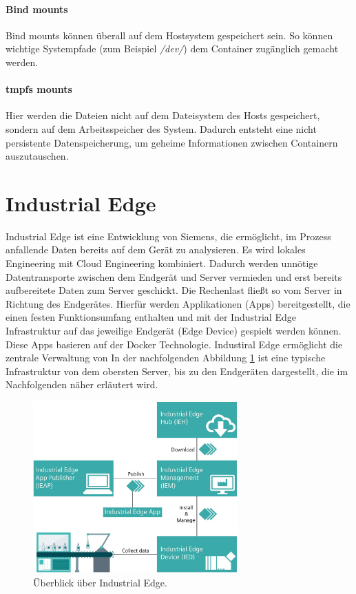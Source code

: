 				\paragraph{Bind mounts}
					Bind mounts können überall auf dem Hostsystem gespeichert sein.
					So können wichtige Systempfade (zum Beispiel \textit{/dev/}) dem Container zugänglich gemacht werden. \cite{dockerStorage}
				
				\paragraph{tmpfs mounts}
					Hier werden die Dateien nicht auf dem Dateisystem des Hosts gespeichert, sondern auf dem Arbeitsspeicher des System.
					Dadurch entsteht eine nicht persistente Datenspeicherung, um geheime Informationen zwischen Containern auszutauschen. \cite{dockerStorage}
					
				
	\section{Industrial Edge}
	\label{Grundlagen:IndustrialEdge}
		Industrial Edge ist eine Entwicklung von Siemens, die ermöglicht, im Prozess anfallende Daten bereits auf dem Gerät zu analysieren.
		Es wird lokales Engineering mit Cloud Engineering kombiniert. \cite{siemensIEM_gettingStarted}
		Dadurch werden unnötige Datentransporte zwischen dem Endgerät und Server vermieden und erst bereits aufbereitete Daten zum Server geschickt.
		Die Rechenlast fließt so vom Server in Richtung des Endgerätes.
		Hierfür werden Applikationen (Apps) bereitgestellt, die einen festen Funktionsumfang enthalten und mit der Industrial Edge Infrastruktur auf das jeweilige Endgerät (Edge Device) gespielt werden können.
		Diese Apps basieren auf der Docker Technologie.
		Industiral Edge ermöglicht die zentrale Verwaltung von
		In der nachfolgenden Abbildung \ref{fig:Grundlagen:IndustrialEdge:Ueberblick} ist eine typische Infrastruktur von dem obersten Server, bis zu den Endgeräten dargestellt, die im Nachfolgenden näher erläutert wird.
		\begin{figure}[h]
			\centering
			\includegraphics[width=0.70\textwidth]{"Bilder/Edge_uebersicht.jpg"}
			\caption{Überblick über Industrial Edge. \cite{siemensIEM_gettingStarted}}
			\label{fig:Grundlagen:IndustrialEdge:Ueberblick}					
		\end{figure}
	
